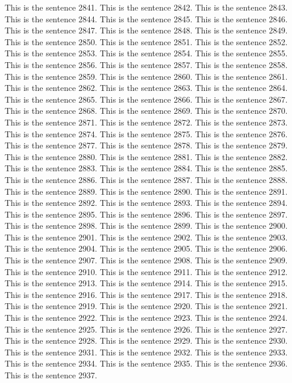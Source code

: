 \documentclass{article}
\begin{document}
This is the sentence 2841.
This is the sentence 2842.
This is the sentence 2843.
This is the sentence 2844.
This is the sentence 2845.
This is the sentence 2846.
This is the sentence 2847.
This is the sentence 2848.
This is the sentence 2849.
This is the sentence 2850.
This is the sentence 2851.
This is the sentence 2852.
This is the sentence 2853.
This is the sentence 2854.
This is the sentence 2855.
This is the sentence 2856.
This is the sentence 2857.
This is the sentence 2858.
This is the sentence 2859.
This is the sentence 2860.
This is the sentence 2861.
This is the sentence 2862.
This is the sentence 2863.
This is the sentence 2864.
This is the sentence 2865.
This is the sentence 2866.
This is the sentence 2867.
This is the sentence 2868.
This is the sentence 2869.
This is the sentence 2870.
This is the sentence 2871.
This is the sentence 2872.
This is the sentence 2873.
This is the sentence 2874.
This is the sentence 2875.
This is the sentence 2876.
This is the sentence 2877.
This is the sentence 2878.
This is the sentence 2879.
This is the sentence 2880.
This is the sentence 2881.
This is the sentence 2882.
This is the sentence 2883.
This is the sentence 2884.
This is the sentence 2885.
This is the sentence 2886.
This is the sentence 2887.
This is the sentence 2888.
This is the sentence 2889.
This is the sentence 2890.
This is the sentence 2891.
This is the sentence 2892.
This is the sentence 2893.
This is the sentence 2894.
This is the sentence 2895.
This is the sentence 2896.
This is the sentence 2897.
This is the sentence 2898.
This is the sentence 2899.
This is the sentence 2900.
This is the sentence 2901.
This is the sentence 2902.
This is the sentence 2903.
This is the sentence 2904.
This is the sentence 2905.
This is the sentence 2906.
This is the sentence 2907.
This is the sentence 2908.
This is the sentence 2909.
This is the sentence 2910.
This is the sentence 2911.
This is the sentence 2912.
This is the sentence 2913.
This is the sentence 2914.
This is the sentence 2915.
This is the sentence 2916.
This is the sentence 2917.
This is the sentence 2918.
This is the sentence 2919.
This is the sentence 2920.
This is the sentence 2921.
This is the sentence 2922.
This is the sentence 2923.
This is the sentence 2924.
This is the sentence 2925.
This is the sentence 2926.
This is the sentence 2927.
This is the sentence 2928.
This is the sentence 2929.
This is the sentence 2930.
This is the sentence 2931.
This is the sentence 2932.
This is the sentence 2933.
This is the sentence 2934.
This is the sentence 2935.
This is the sentence 2936.
This is the sentence 2937.
\end{document}

